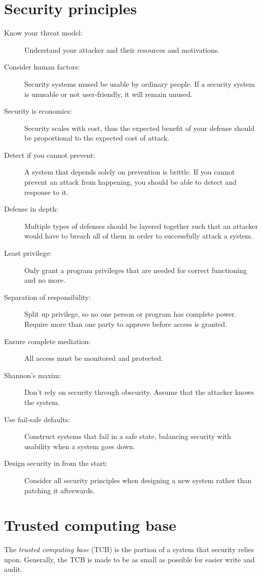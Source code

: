 \section{Security principles}
\begin{description}
    \item[Know your threat model:]
    Understand your attacker and their resources and motivations.
    \item[Consider human factors:]
    Security systems mused be usable by ordinary people. If a security system is unusable or not user-friendly, it will remain unused.
    \item[Security is economics:] 
    Security scales with cost, thus the expected benefit of your defense should be proportional to the expected cost of attack.
    \item[Detect if you cannot prevent:]
    A system that depends solely on prevention is brittle. If you cannot prevent an attack from happening, you should be able to detect and response to it.
    \item[Defense in depth:]
    Multiple types of defenses should be layered together such that an attacker would have to breach all of them in order to successfully attack a system.
    \item[Least privilege:]
    Only grant a program privileges that are needed for correct functioning and no more.
    \item[Separation of responsibility:]
    Split up privilege, so no one person or program has complete power. Require more than one party to approve before access is granted.
    \item[Ensure complete mediation:]
    All access must be monitored and protected.
    \item[Shannon's maxim:] Don't rely on security through obscurity. Assume that the attacker knows the system.
    \item[Use fail-safe defaults:]
    Construct systems that fail in a safe state, balancing security with usability when a system goes down.
    \item[Design security in from the start:]
    Consider all security principles when designing a new system rather than patching it afterwards.
\end{description}

\section{Trusted computing base}
The \emph{trusted computing base} (TCB) is the portion of a system that security relies upon. Generally, the TCB is made to be as small as possible for easier write and audit.

